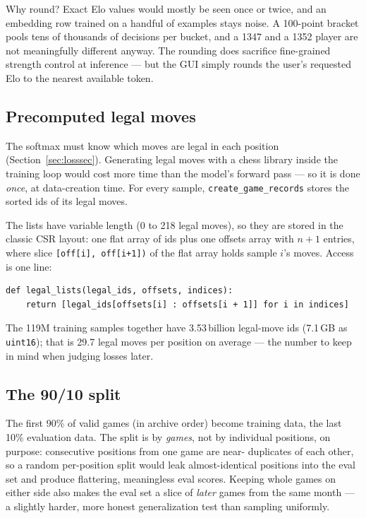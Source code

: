 \documentclass[10pt,a4paper]{article}
\newcommand{\code}[1]{\texttt{#1}}
\begin{document}
Why round? Exact Elo values would mostly be seen once or twice, and an
embedding row trained on a handful of examples stays noise. A 100-point
bracket pools tens of thousands of decisions per bucket, and a 1347 and a
1352 player are not meaningfully different anyway. The rounding does
sacrifice fine-grained strength control at inference --- but the GUI
simply rounds the user's requested Elo to the nearest available token.

\subsection{Precomputed legal moves}

The softmax must know which moves are legal in each position
(Section~\ref{sec:losssec}). Generating legal moves with a chess library
inside the training loop would cost more time than the model's forward
pass --- so it is done \emph{once}, at data-creation time. For every
sample, \code{create\_game\_records} stores the sorted ids of its legal
moves.

The lists have variable length (0 to 218 legal moves), so they are stored
in the classic CSR layout: one flat array of ids plus one offsets array
with $n+1$ entries, where slice \code{[off[i], off[i+1])} of the flat
array holds sample $i$'s moves. Access is one line:

\begin{lstlisting}[style=code, caption={Legal-move lookup in CSR form
(\code{train.py}). Pure NumPy slicing --- no chess library anywhere near
the training loop.}, label={lst:csr}]
def legal_lists(legal_ids, offsets, indices):
    return [legal_ids[offsets[i] : offsets[i + 1]] for i in indices]
\end{lstlisting}

The 119M training samples together have 3.53\,billion legal-move ids
(7.1\,GB as \code{uint16}); that is 29.7 legal moves per position on
average --- the number to keep in mind when judging losses later.

\subsection{The 90/10 split}

The first 90\% of valid games (in archive order) become training data, the
last 10\% evaluation data. The split is by \emph{games}, not by individual
positions, on purpose: consecutive positions from one game are near-
duplicates of each other, so a random per-position split would leak
almost-identical positions into the eval set and produce flattering,
meaningless eval scores. Keeping whole games on either side also makes the
eval set a slice of \emph{later} games from the same month --- a slightly
harder, more honest generalization test than sampling uniformly.
\end{document}
